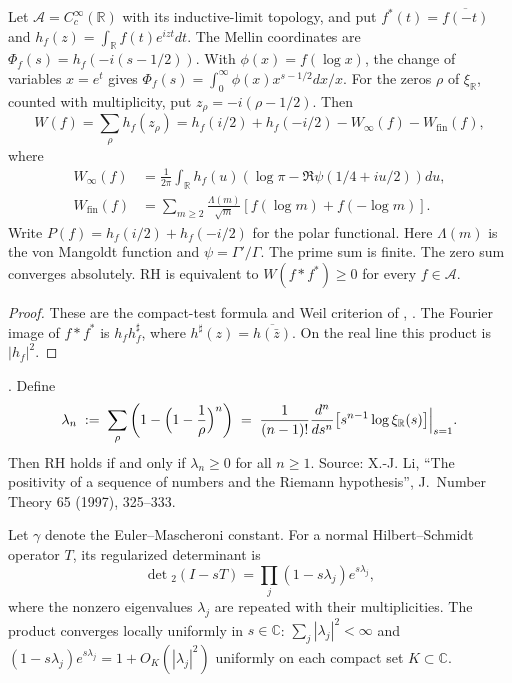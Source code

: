 \begin{theorem}
\label{v4-arith:w5-direct:thm:weil-positivity}
Let $\mathscr A=C_c^\infty(\mathbb R)$ with its inductive-limit
 topology, and put $f^*(t)=\overline{f(-t)}$ and
$h_f(z)=\int_{\mathbb R}f(t)e^{izt}dt$.
The Mellin coordinates are $\Phi_f(s)=h_f(-i(s-1/2))$.
With $\phi(x)=f(\log x)$, the change of variables $x=e^t$ gives
$\Phi_f(s)=\int_0^\infty\phi(x)x^{s-1/2}dx/x$.
For the zeros $\rho$ of $\xi_{\mathbb R}$, counted with multiplicity,
put $z_\rho=-i(\rho-1/2)$. Then
\begin{equation}
\label{v4-arith:w5-direct:eq:weil-distribution}
 W(f)=\sum_\rho h_f(z_\rho)
     =h_f(i/2)+h_f(-i/2)-W_\infty(f)-W_{\mathrm{fin}}(f),
\end{equation}
where
\[
\begin{aligned}
 W_\infty(f)&=\frac1{2\pi}\int_{\mathbb R}h_f(u)
 (\log\pi-\Re\psi(1/4+iu/2))du,\\
 W_{\mathrm{fin}}(f)&=\sum_{m\ge2}\frac{\Lambda(m)}{\sqrt m}
 [f(\log m)+f(-\log m)].
\end{aligned}
\]
Write $P(f)=h_f(i/2)+h_f(-i/2)$ for the polar functional.
Here $\Lambda(m)$ is the von Mangoldt function and $\psi=\Gamma'/\Gamma$.
The prime sum is finite. The zero sum converges absolutely.
RH is equivalent to $W(f*f^*)\ge0$ for every $f\in\mathscr A$.
\end{theorem}
\begin{proof}
These are the compact-test formula and Weil criterion of
, .
The Fourier image of $f*f^*$ is $h_fh_f^\sharp$, where
$h^\sharp(z)=\overline{h(\bar z)}$. On the real line this product
is $|h_f|^2$.
\end{proof}
\begin{theorem}[Li positivity]
\label{v4-arith:w5-direct:thm:li-positivity}
\ClaimStatusProvedElsewhere. Define
\begin{equation}
\label{v4-arith:w5-direct:eq:li-coef}
\lambda_{n}\;:=\;\sum_{\rho}\left(1-\Bigl(1-\frac{1}{\rho}\Bigr)^{n}\right)
\;=\;\frac{1}{(n-1)!}\frac{d^{n}}{ds^{n}}
\bigl[s^{n-1}\log\xi_{\mathbb{R}}(s)\bigr]\Big|_{s=1}.
\end{equation}
Then RH holds if and only if \(\lambda_{n}\geq 0\) for all \(n\geq 1\).
Source: X.-J. Li, ``The positivity of a sequence of numbers and the
Riemann hypothesis'', J.~Number Theory 65 (1997), 325--333.
\end{theorem}

Let $\gamma$ denote the Euler--Mascheroni constant. For a normal
Hilbert--Schmidt operator $T$, its regularized determinant is
\[
 \det{}_2(I-sT)=\prod_j(1-s\lambda_j)e^{s\lambda_j},
\]
where the nonzero eigenvalues $\lambda_j$ are repeated with their
multiplicities. The product converges locally uniformly in $s\in\mathbb C$:
$\sum_j|\lambda_j|^2<\infty$ and
$(1-s\lambda_j)e^{s\lambda_j}=1+O_K(|\lambda_j|^2)$ uniformly on
each compact set $K\subset\mathbb C$.

